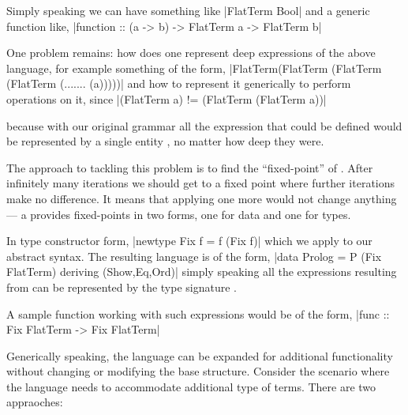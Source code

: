 \documentclass[thesis-solanki.tex]{subfiles}
\begin{document}
Simply speaking we can have something like
|FlatTerm Bool|
and a generic function like,
|function :: (a -> b) -> FlatTerm a -> FlatTerm b|

One problem remains: how does one represent deep expressions
of the above language,
for example something of the form,
|FlatTerm(FlatTerm (FlatTerm (FlatTerm (....... (a)))))|
and how to represent it generically to perform operations on it, since
|(FlatTerm a) != (FlatTerm (FlatTerm a))|

%
because with our original grammar all the expression that could be defined would be represented by a single entity
, no matter how deep they were.

The approach to tackling this problem is to find the ``fixed-point'' of .
After infinitely many iterations we should get to a fixed point where further iterations make no
difference.
It means that applying one more  would not change anything---%
a  provides fixed-points in two forms, one for data and one for types.

In type constructor form,
|newtype Fix f = f (Fix f)|
which we apply to our abstract syntax.
\newline
\noindent The resulting language is of the form,
|data Prolog = P (Fix FlatTerm) deriving (Show,Eq,Ord)|
%
simply speaking all the expressions resulting from  can be represented  by the type
signature .

A sample function working with such expressions would be of the form,
|func :: Fix FlatTerm -> Fix FlatTerm|


Generically speaking, the language can be expanded for additional functionality without changing or modifying the
base structure.
Consider the scenario where the language needs to accommodate additional type of terms. There are two appraoches:
\end{document}
